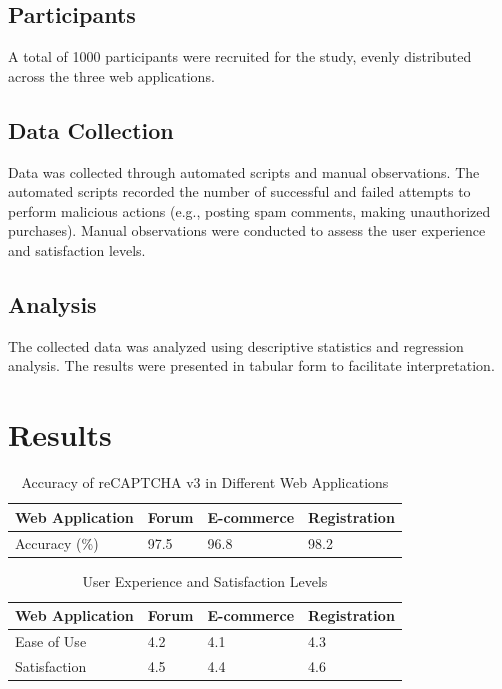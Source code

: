 \documentclass{article}
\begin{document}
\subsection{Participants}
A total of 1000 participants were recruited for the study, evenly distributed across the three web applications.

\subsection{Data Collection}
Data was collected through automated scripts and manual observations. The automated scripts recorded the number of successful and failed attempts to perform malicious actions (e.g., posting spam comments, making unauthorized purchases). Manual observations were conducted to assess the user experience and satisfaction levels.

\subsection{Analysis}
The collected data was analyzed using descriptive statistics and regression analysis. The results were presented in tabular form to facilitate interpretation.

\section{Results}
\label{sec:results}

\begin{table}[ht]
\centering
\caption{Accuracy of reCAPTCHA v3 in Different Web Applications}
\label{tab:accuracy}
\begin{tabular}{@{}llll@{}}
\toprule
Web Application & Forum & E-commerce & Registration \\
\midrule
Accuracy (\%)   & 97.5   & 96.8      & 98.2       \\
\bottomrule
\end{tabular}
\end{table}

\begin{table}[ht]
\centering
\caption{User Experience and Satisfaction Levels}
\label{tab:user_experience}
\begin{tabular}{@{}llll@{}}
\toprule
Web Application & Forum & E-commerce & Registration \\
\midrule
Ease of Use     & 4.2    & 4.1        & 4.3        \\
Satisfaction    & 4.5    & 4.4        & 4.6        \\
\bottomrule
\end{tabular}
\end{table}
\end{document}
